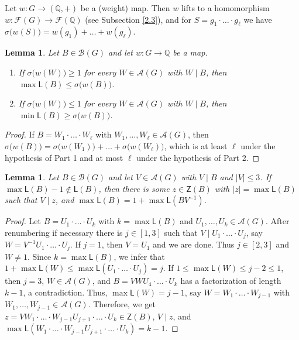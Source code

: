 \documentclass[a4paper, 10pt]{amsart}
\theoremstyle{plain}
\newtheorem{lemma}[theorem]{\bf Lemma}
\theoremstyle{definition}
\theoremstyle{definition}
\newcommand{\Q}{\mathbb Q}
\numberwithin{equation}{section}
\begin{document}
Let  $w \colon G \to (\Q, +)$ be  a (weight) map. Then $w$ lifts to a homomorphism $w \colon \mathcal F (G) \to \mathcal F (\Q)$ (see Subsection \ref{2.3}), and for $S = g_1 \cdot \ldots \cdot g_\ell$ we have $\sigma \big( w (S) \big) = w(g_1) + \ldots + w(g_\ell)$.

\begin{lemma} \label{lem:weight-bound}
Let $B \in \mathcal B (G)$ and let $w \colon G \to \Q$ be a map.
\begin{enumerate}
\item If $\sigma \big(w(W) \big) \ge 1$ for every $W \in \mathcal A (G)$ with $W \mid B$, then
      $\max \mathsf L (B) \le \sigma \big(w(B) \big)$.
\item If $\sigma \big( w(W) \big) \le 1$ for every $W \in \mathcal A (G)$ with $W \mid B$, then
      $\min \mathsf L (B) \ge \sigma \big(w(B) \big)$.
\end{enumerate}
\end{lemma}

\begin{proof}
If $B = W_1 \cdot \ldots \cdot W_\ell$ with $W_1, \ldots, W_\ell \in \mathcal A (G)$,
then $\sigma \big( w(B) \big)  = \sigma \big( w(W_1) \big)  + \ldots +  \sigma \big(w(W_\ell) \big)$, which is at least $\ell$ under the
hypothesis of Part 1 and at most $\ell$ under the hypothesis of Part 2.
\end{proof}

\begin{lemma}\label{A:short-atom}
	Let $B \in \mathcal B (G)$ and let $V \in \mathcal A (G)$ with $V \mid B$ and
	$|V| \le 3$.  If $\max\mathsf L(B)-1\notin\mathsf L(B)$, then there is some $z \in \mathsf Z (B)$ with $|z|=\max \mathsf L (B)$ such that $V \mid z$, 
	and $\max\mathsf L(B)=1+\max\mathsf L(BV^{-1})$.
\end{lemma}

\begin{proof}
Let $B = U_1 \cdot \ldots \cdot U_k$ with $k =\max \mathsf L (B)$ and $U_1, \ldots, U_k \in \mathcal A (G)$. After renumbering if necessary there is $j \in [1,3]$ such that $V \mid U_1 \cdot \ldots \cdot U_j$, say $W = V^{-1}U_1 \cdot \ldots \cdot U_j$. If $j=1$, then $V=U_1$ and we are done. Thus $j \in [2,3]$ and $W \ne 1$. Since $k= \max \mathsf L (B)$, we infer that $1+\max \mathsf L (W) \le \max \mathsf L (U_1 \cdot \ldots \cdot U_j) = j$. If $1 \le \max \mathsf L (W) \le j-2\le 1$, then $j=3$, $W \in \mathcal A (G)$, and $B = VWU_4 \cdot \ldots \cdot U_k$ has a factorization of length $k-1$, a contradiction. Thus, $\max \mathsf L (W)=j-1$, say $W = W_1 \cdot \ldots \cdot W_{j-1}$ with $W_1, \ldots, W_{j-1} \in \mathcal A (G)$. Therefore, we get $z=VW_1 \cdot \ldots \cdot W_{j-1}U_{j+1} \cdot \ldots \cdot U_k \in \mathsf Z (B)$, $V \mid z$, and $\max \mathsf L ( W_1 \cdot \ldots \cdot W_{j-1}U_{j+1} \cdot \ldots \cdot U_k) = k-1$.
\end{proof}
\end{document}
